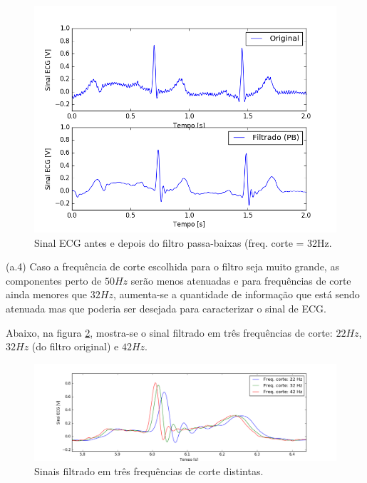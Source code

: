 \documentclass[12pt,letterpaper]{article}
\begin{document}
\begin{enumerate}[label=(\alph*)]
        \begin{figure}[H]
            \centering
            \includegraphics[width=15cm]{TC1/images/Q2_comparativo_orig_pb.png}
            \caption{Sinal ECG antes e depois do filtro passa-baixas (freq. corte = 32Hz.}
            \label{fig:5}
        \end{figure}
    
\newpage
    (a.4) Caso a frequência de corte escolhida para o filtro seja muito grande, as componentes perto de $50Hz$ serão menos atenuadas e para frequências de corte ainda menores que $32Hz$, aumenta-se a quantidade de informação que está sendo atenuada mas que poderia ser desejada para caracterizar o sinal de ECG.
    
    Abaixo, na figura \ref{fig:8}, mostra-se o sinal filtrado em três frequências de corte: $22Hz$, $32Hz$ (do filtro original) e $42Hz$.

        \begin{figure}[H]
            \centering
            \includegraphics[width=15cm]{TC1/images/Q2a4_freqs_corte.png}
            \caption{Sinais filtrado em três frequências de corte distintas.}
            \label{fig:8}
        \end{figure}



\end{enumerate}
\end{document}
